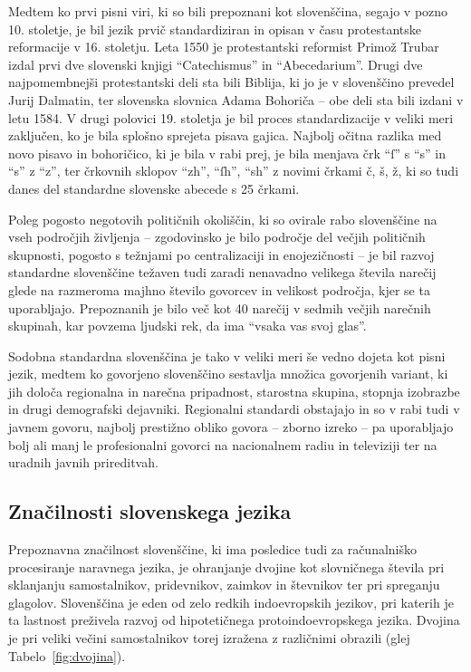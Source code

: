 \begin{multicols}{2}
Medtem ko prvi pisni viri, ki so bili prepoznani kot slovenščina, segajo v pozno 10. stoletje, je bil jezik prvič standardiziran in opisan v času protestantske reformacije v 16. stoletju. Leta 1550 je protestantski reformist Primož Trubar izdal prvi dve slovenski knji\-gi “Catechismus” in “Abecedarium”. Drugi dve najpomembnejši protestantski deli sta bili Biblija, ki jo je v slovenščino prevedel Jurij Dalmatin, ter slovenska slovnica Adama Bohoriča – obe deli sta bili izdani v letu 1584. 
V drugi polovici 19. stoletja je bil proces standardizacije v veliki meri zaključen, ko je bila splošno sprejeta pisava gajica. Najbolj očitna razlika med novo pisavo in bohoričico, ki je bila v rabi prej, je bila menjava črk “ſ” s “s” in “s” z “z”, ter črkovnih sklopov “zh”, “ſh”, “sh” z novimi črkami č, š, ž, ki so tudi danes del standardne slovenske abecede s 25 črkami.

Poleg pogosto negotovih političnih okoliščin, ki so ovirale rabo slovenščine na vseh področjih živ\-ljenja – zgodovinsko je bilo področje del večjih političnih skupnosti, pogosto s težnjami po centra\-lizaciji in enojezičnosti – je bil razvoj standardne slovenščine težaven tudi zaradi nenavadno velikega števila narečij glede na razmeroma majhno število govorcev in velikost področja, kjer se ta uporabljajo. Prepoznanih je bilo več kot 40 narečij v sedmih večjih narečnih skupinah, kar povzema ljudski rek, da ima “vsaka vas svoj glas”. 


Sodobna standardna slovenščina je tako v veliki meri še vedno dojeta kot pisni jezik, medtem ko govorjeno slovenščino sestavlja množica govorjenih variant, ki jih določa regionalna in narečna pripadnost, starostna skupina, stopnja izobrazbe in drugi demografski dejavniki. Regionalni standardi obstajajo in so v rabi tudi v javnem govoru, naj\-bolj prestižno obliko govora – zborno izreko – pa uporabljajo bolj ali manj le profesionalni govorci na nacionalnem radiu in televiziji ter na uradnih javnih prireditvah. 

\subsection{Značilnosti slovenskega jezika}

Prepoznavna značilnost slovenščine, ki ima posledice tudi za računalniško procesiranje narav\-nega jezika, je ohranjanje dvojine kot slovničnega števila pri sklanjanju samostalnikov, pridevnikov, zaimkov in števnikov ter pri spreganju glagolov. Slovenščina je eden od zelo redkih indoevropskih jezikov, pri katerih je ta lastnost preživela razvoj od hipotetičnega protoindoevropskega jezika. Dvojina je pri veliki večini samostalnikov torej izražena z različnimi obrazili (glej Tabelo~\ref{fig:dvojina}).


\end{multicols}
